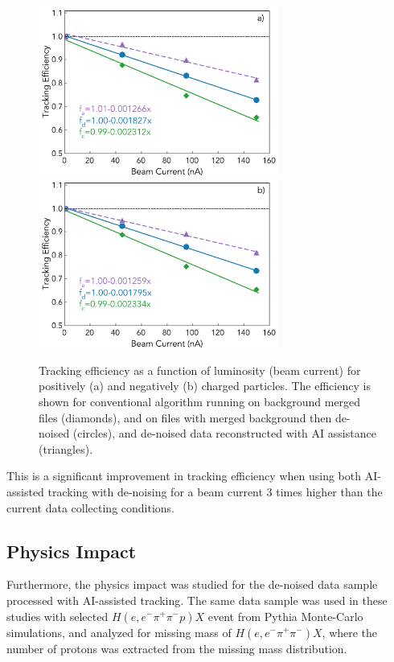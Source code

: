 \begin{figure}[!h]
\begin{center}
 \includegraphics[width=3.1in]{images/figure_lscan_pos_ai.pdf}
 \includegraphics[width=3.1in]{images/figure_lscan_neg_ai.pdf}
\caption {Tracking efficiency as a function of luminosity (beam current) for positively (a) and negatively (b) charged particles.  The efficiency is shown for
conventional algorithm running on background merged files (diamonds), and on files with merged background then de-noised (circles), and de-noised data reconstructed 
 with AI assistance (triangles).}
 \label{lscan::conv_dn_ai}
 \end{center}
\end{figure}

This is a significant improvement in tracking efficiency when using both AI-assisted tracking with de-noising for a beam current 3 times higher than the current data collecting conditions. 

\subsection{Physics Impact}

Furthermore, the physics impact was studied for the de-noised data sample processed with AI-assisted tracking. The same data 
sample was used in these studies with selected $H(e,e^-\pi^+\pi^-p)X$ event from Pythia Monte-Carlo simulations, and analyzed for
missing mass of $H(e,e^-\pi^+\pi^-)X$, where the number of protons was extracted from the missing mass distribution.


